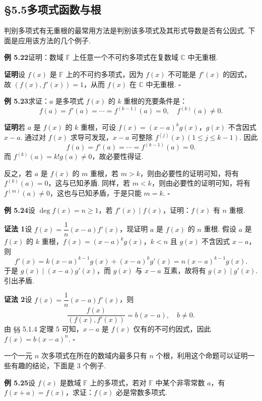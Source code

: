 \documentclass[UTF8, 12pt, fontset=fandol, oneside]{ctexart}
\begin{document}
\subsection*{§5.5\quad 多项式函数与根}

判别多项式有无重根的最常用方法是判别该多项式及其形式导数是否有公因式. 下面是应用该方法的几个例子.

\noindent\textbf{例 5.22}\quad 证明：数域 $\mathbb{F}$ 上任意一个不可约多项式在复数域 $\mathbb{C}$ 中无重根.

\noindent\textbf{证明}\quad 设 $f(x)$ 是 $\mathbb{F}$ 上的不可约多项式，因为 $f(x)$ 不可能是 $f'(x)$ 的因式，故 $(f(x),f'(x))=1$，从而 $f(x)$ 在 $\mathbb{C}$ 中无重根. \hfill $\square$

\noindent\textbf{例 5.23}\quad 求证：$a$ 是多项式 $f(x)$ 的 $k$ 重根的充要条件是：
\[
f(a)=f'(a)=\cdots=f^{(k-1)}(a)=0,\quad f^{(k)}(a)\ne0.
\]

\noindent\textbf{证明}\quad 若 $a$ 是 $f(x)$ 的 $k$ 重根，可设 $f(x)=(x-a)^kg(x)$，$g(x)$ 不含因式 $x-a$. 通过对 $f(x)$ 求导可发现，$x-a$ 可整除 $f^{(j)}(x)(1\le j\le k-1)$. 因此
\[
f(a)=f'(a)=\cdots=f^{(k-1)}(a)=0.
\]
而 $f^{(k)}(a)=k!g(a)\ne0$，故必要性得证.

反之，若 $a$ 是 $f(x)$ 的 $m$ 重根，若 $m>k$，则由必要性的证明可知，将有 $f^{(k)}(a)=0$，这与已知矛盾. 同样，若 $m<k$，则由必要性的证明可知，将有 $f^{(m)}(a)\ne0$，这也与已知矛盾，于是只能 $m=k$. \hfill $\square$

\noindent\textbf{例 5.24}\quad 设 $\deg f(x)=n\ge1$，若 $f'(x)\mid f(x)$，证明：$f(x)$ 有 $n$ 重根.

\noindent\textbf{证法 1}\quad 设 $f(x)=\dfrac1n(x-a)f'(x)$，现证明 $a$ 是 $f(x)$ 的 $n$ 重根. 假设 $a$ 是 $f(x)$ 的 $k$ 重根，$f(x)=(x-a)^kg(x)$，$k<n$ 且 $g(x)$ 不含因式 $x-a$，则
\[
f'(x)=k(x-a)^{k-1}g(x)+(x-a)^kg'(x)=n(x-a)^{k-1}g(x).
\]
于是 $g(x)\mid (x-a)g'(x)$，而 $g(x)$ 与 $x-a$ 互素，故将有 $g(x)\mid g'(x)$. 引出矛盾.

\noindent\textbf{证法 2}\quad 设 $f(x)=\dfrac1n(x-a)f'(x)$，则
\[
\frac{f(x)}{(f(x),f'(x))}=b(x-a),\quad b\ne0.
\]
由 §§ 5.1.4 定理 5 可知，$x-a$ 是 $f(x)$ 仅有的不可约因式，因此 $f(x)=b(x-a)^n$. \hfill $\square$

一个一元 $n$ 次多项式在所在的数域内最多只有 $n$ 个根，利用这个命题可以证明一些有趣的结论，下面是 3 个例子.

\noindent\textbf{例 5.25}\quad 设 $f(x)$ 是数域 $\mathbb{F}$ 上的多项式，若对 $\mathbb{F}$ 中某个非零常数 $a$，有 $f(x+a)=f(x)$，求证：$f(x)$ 必是常数多项式.
\end{document}
